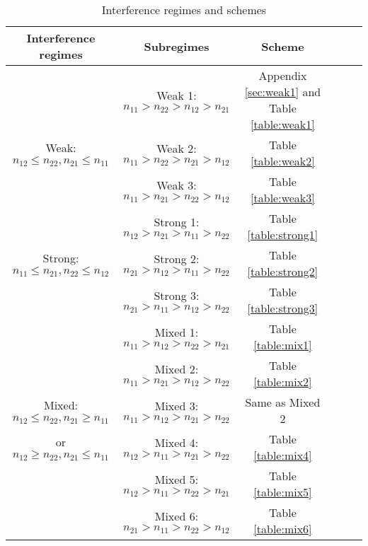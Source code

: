 \documentclass[12pt, draftclsnofoot, onecolumn]{IEEEtran}
\theoremstyle{definition}
\begin{document}
\begin{table}[ht!]
  \centering
 \caption{Interference regimes and schemes}\label{table:result}
\begin{tabular}{|c|c|c|c|c|c|}
\hline
 Interference regimes &  Subregimes   & Scheme  \\
 \hline
  	&	Weak 1: $n_{11}>n_{22}>n_{12}>n_{21}$	  	     & Appendix \ref{sec:weak1} and Table \ref{table:weak1} \\
  Weak: $n_{12}\leq n_{22},n_{21}\leq n_{11}$	&	Weak 2: $n_{11}>n_{22}>n_{21}>n_{12}$  	     & Table \ref{table:weak2} \\
          &		Weak 3: $n_{11}>n_{21}>n_{22}>n_{12}$ & Table \ref{table:weak3}  \\
\hline
  	&	Strong 1: $n_{12}>n_{21}>n_{11}>n_{22}$	  	     & Table \ref{table:strong1} \\
  Strong: $n_{11}\leq n_{21},n_{22}\leq n_{12}$	&	Strong 2: $n_{21}>n_{12}>n_{11}>n_{22}$  	     & Table \ref{table:strong2} \\
          &		Strong 3: $n_{21}>n_{11}>n_{12}>n_{22}$ & Table \ref{table:strong3}  \\
\hline
  	&	Mixed 1: $n_{11}>n_{12}>n_{22}>n_{21}$	  	     & Table \ref{table:mix1} \\
  	&	Mixed 2: $n_{11}>n_{21}>n_{12}>n_{22}$  	     & Table \ref{table:mix2} \\
    Mixed: $n_{12}\leq n_{22},n_{21}\geq n_{11}$      &		Mixed 3: $n_{11}>n_{12}>n_{21}>n_{22}$ & Same as Mixed 2  \\
      or   $n_{12}\geq n_{22},n_{21}\leq n_{11}$        &		Mixed 4: $n_{12}>n_{11}>n_{21}>n_{22}$ & Table \ref{table:mix4}  \\
                          &		Mixed 5: $n_{12}>n_{11}>n_{22}>n_{21}$ & Table \ref{table:mix5}  \\
                                        &		Mixed 6: $n_{21}>n_{11}>n_{22}>n_{12}$ & Table \ref{table:mix6}  \\
\hline
\end{tabular}
\end{table}
\end{document}
